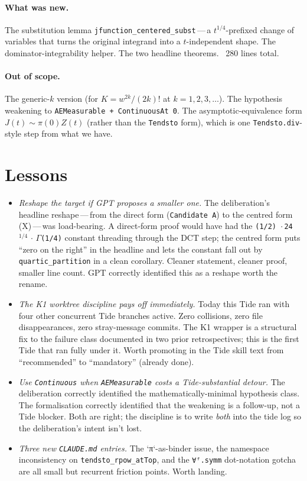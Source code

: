 \documentclass[11pt]{article}
\begin{document}
\paragraph{What was new.} The substitution lemma
\texttt{jfunction\_centered\_subst}\,---\,a $t^{1/4}$-prefixed change
of variables that turns the original integrand into a
$t$-independent shape. The dominator-integrability helper. The two
headline theorems. ~280 lines total.

\paragraph{Out of scope.} The generic-$k$ version (for
$K = w^{2k}/(2k)!$ at $k = 1, 2, 3, \ldots$). The hypothesis
weakening to \texttt{AEMeasurable + ContinuousAt 0}. The
asymptotic-equivalence form $J(t) \sim \pi(0) Z(t)$ (rather than the
\texttt{Tendsto} form), which is one
\texttt{Tendsto.div}-style step from what we have.

\section{Lessons}

\begin{itemize}[leftmargin=*]
\item \emph{Reshape the target if GPT proposes a smaller one.}
The deliberation's headline reshape\,---\,from the direct form
(\texttt{Candidate A}) to the centred form (X)\,---\,was load-bearing.
A direct-form proof would have had the
\texttt{(1/2)\,$\cdot\,$24$^{1/4}\,\cdot\,\Gamma$(1/4)} constant
threading through the DCT step; the centred form puts ``zero on the
right'' in the headline and lets the constant fall out by
\texttt{quartic\_partition} in a clean corollary. Cleaner statement,
cleaner proof, smaller line count. GPT correctly identified this as
a reshape worth the rename.

\item \emph{The K1 worktree discipline pays off immediately.}
Today this Tide ran with four other concurrent Tide branches active.
Zero collisions, zero file disappearances, zero stray-message
commits. The K1 wrapper is a structural fix to the failure class
documented in two prior retrospectives; this is the first Tide that
ran fully under it. Worth promoting in the Tide skill text from
``recommended'' to ``mandatory'' (already done).

\item \emph{Use \texttt{Continuous} when \texttt{AEMeasurable}
costs a Tide-substantial detour.} The deliberation correctly
identified the mathematically-minimal hypothesis class. The
formalisation correctly identified that the weakening is a
follow-up, not a Tide blocker. Both are right; the discipline is
to write \emph{both} into the tide log so the deliberation's intent
isn't lost.

\item \emph{Three new \texttt{CLAUDE.md} entries.} The `π`-as-binder
issue, the namespace inconsistency on \texttt{tendsto\_rpow\_atTop},
and the \texttt{∀ᶠ.symm} dot-notation gotcha are all small but
recurrent friction points. Worth landing.
\end{itemize}
\end{document}
